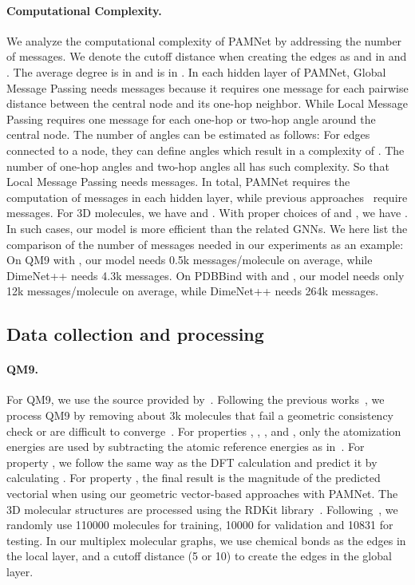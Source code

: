 \documentclass[fleqn,10pt]{wlscirep}
\newcommand{\method}{PAMNet\xspace}
\begin{document}
\paragraph{Computational Complexity.}
We analyze the computational complexity of \method by addressing the number of messages. We denote the cutoff distance when creating the edges as  and  in  and . The average degree is  in  and is  in . In each hidden layer of \method, Global Message Passing needs  messages because it requires one message for each pairwise distance between the central node and its one-hop neighbor. While Local Message Passing requires one message for each one-hop or two-hop angle around the central node. The number of angles can be estimated as follows: For  edges connected to a node, they can define  angles which result in a complexity of . The number of one-hop angles and two-hop angles all has such complexity. So that Local Message Passing needs  messages. In total, \method requires the computation of  messages in each hidden layer, while previous approaches~\cite{klicpera_dimenet_2020,klicpera_dimenetpp_2020, shui2020heterogeneous,li2021structure,liu2022spherical} require  messages. For 3D molecules, we have  and . With proper choices of  and , we have . In such cases, our model is more efficient than the related GNNs. We here list the comparison of the number of messages needed in our experiments as an example: On QM9 with , our model needs 0.5k messages/molecule on average, while DimeNet++ needs 4.3k messages. On PDBBind with  and , our model needs only 12k messages/molecule on average, while DimeNet++ needs 264k messages.

\subsection*{Data collection and processing}

\paragraph{QM9.}
For QM9, we use the source provided by~\cite{ramakrishnan2014quantum}. Following the previous works~\cite{klicpera_dimenet_2020,klicpera_dimenetpp_2020, shui2020heterogeneous}, we process QM9 by removing about 3k molecules that fail a geometric consistency check or are difficult to converge~\cite{faber2017prediction}. For properties , , , and , only the atomization energies are used by subtracting the atomic reference energies as in~\cite{klicpera_dimenet_2020,klicpera_dimenetpp_2020, shui2020heterogeneous}. For property , we follow the same way as the DFT calculation and predict it by calculating . For property , the final result is the magnitude of the predicted vectorial  when using our geometric vector-based approaches with \method. The 3D molecular structures are processed using the RDKit library~\cite{landrum2013rdkit}. Following~\cite{klicpera_dimenet_2020}, we randomly use 110000 molecules for training, 10000 for validation and 10831 for testing. In our multiplex molecular graphs, we use chemical bonds as the edges in the local layer, and a cutoff distance (5 or 10) to create the edges in the global layer.
\end{document}
